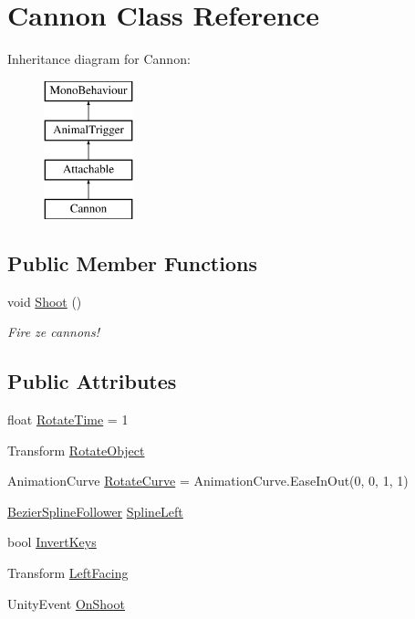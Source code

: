 \hypertarget{class_cannon}{}\section{Cannon Class Reference}
\label{class_cannon}
Inheritance diagram for Cannon\+:\begin{figure}[H]
\begin{center}
\leavevmode
\includegraphics[height=4.000000cm]{class_cannon}
\end{center}
\end{figure}
\subsection*{Public Member Functions}
\begin{DoxyCompactItemize}
\item 
void \mbox{\hyperlink{class_cannon_a960d1029f84d68f9a7e6404bed82b1c5}{Shoot}} ()
\begin{DoxyCompactList}\small\item\em Fire ze cannons! \end{DoxyCompactList}\end{DoxyCompactItemize}
\subsection*{Public Attributes}
\begin{DoxyCompactItemize}
\item 
float \mbox{\hyperlink{class_cannon_a9516c36d3a448bad28896f332fcedf53}{Rotate\+Time}} = 1
\item 
Transform \mbox{\hyperlink{class_cannon_a058c26253647d4f92ddcb8da7ea5ec15}{Rotate\+Object}}
\item 
Animation\+Curve \mbox{\hyperlink{class_cannon_a5c22134c62741c089a8ae471c7afee29}{Rotate\+Curve}} = Animation\+Curve.\+Ease\+In\+Out(0, 0, 1, 1)
\item 
\mbox{\hyperlink{class_bezier_spline_follower}{Bezier\+Spline\+Follower}} \mbox{\hyperlink{class_cannon_a6983ae781175cb879d1c4daacf0a72ff}{Spline\+Left}}
\item 
bool \mbox{\hyperlink{class_cannon_a4b17c78dd58465371d81c31f19f0030c}{Invert\+Keys}}
\item 
Transform \mbox{\hyperlink{class_cannon_a8ea813a90bea970311f357c5d4cb10e7}{Left\+Facing}}
\item 
Unity\+Event \mbox{\hyperlink{class_cannon_a6be8bc50dab6d91351513655c7c4f304}{On\+Shoot}}
\end{DoxyCompactItemize}
